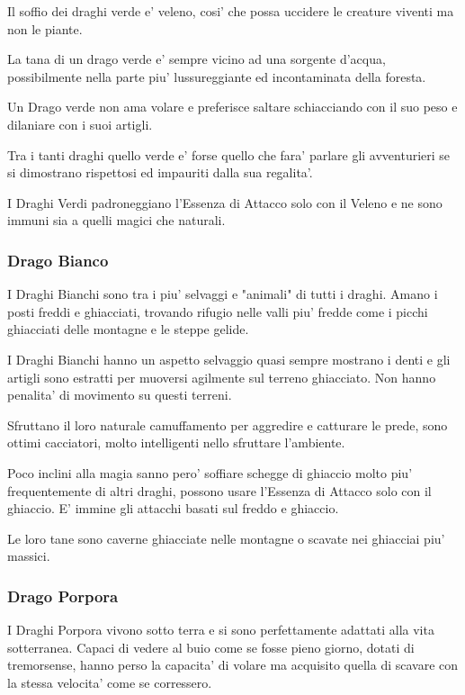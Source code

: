 \documentclass[a4paper,11pt,twoside,openany]{book}
\begin{document}
Il soffio dei draghi verde e' veleno, cosi' che possa uccidere le creature viventi ma non le piante.

La tana di un drago verde e' sempre vicino ad una sorgente d'acqua, possibilmente nella parte piu' lussureggiante ed incontaminata della foresta.

Un Drago verde non ama volare e preferisce saltare schiacciando con il suo peso e dilaniare con i suoi artigli.

Tra i tanti draghi quello verde e' forse quello che fara' parlare gli avventurieri se si dimostrano rispettosi ed impauriti dalla sua regalita'.

I Draghi Verdi padroneggiano l'Essenza di Attacco solo con il Veleno e ne sono immuni sia a quelli magici che naturali.

\subsubsection{Drago Bianco} 

I Draghi Bianchi sono tra i piu' selvaggi e "animali" di tutti i draghi.
Amano i posti freddi e ghiacciati, trovando rifugio nelle valli piu' fredde come i picchi ghiacciati delle montagne e le steppe gelide.

I Draghi Bianchi hanno un aspetto selvaggio quasi sempre mostrano i denti e gli artigli sono estratti per muoversi agilmente sul terreno ghiacciato.
Non hanno penalita' di movimento su questi terreni.

Sfruttano il loro naturale camuffamento per aggredire e catturare le prede, sono ottimi cacciatori, molto intelligenti nello sfruttare l'ambiente.

Poco inclini alla magia sanno pero' soffiare schegge di ghiaccio molto piu' frequentemente di altri draghi, possono usare l'Essenza di Attacco solo con il ghiaccio. E' immine gli attacchi basati sul freddo e ghiaccio.

Le loro tane sono caverne ghiacciate nelle montagne o scavate nei ghiacciai piu' massici.


\subsubsection{Drago Porpora} 

I Draghi Porpora vivono sotto terra e si sono perfettamente adattati alla vita sotterranea.
Capaci di vedere al buio come se fosse pieno giorno, dotati di tremorsense, hanno perso la capacita' di volare ma acquisito quella di scavare con la stessa velocita' come se corressero.
\end{document}
